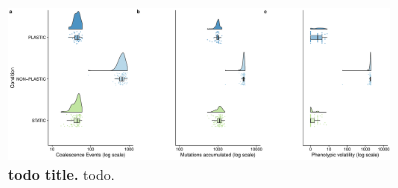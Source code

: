 
\begin{figure}[h!]
    \centering
    \includegraphics[width=0.9\textwidth]{media/evolutionary-dynamics.pdf}
    \caption{\small
    \textbf{todo title.}
    todo.
    }
    \label{fig:evolutionary-dynamics}
\end{figure}